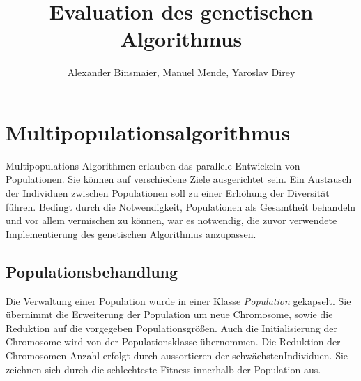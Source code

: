 \documentclass[12pt,a4paper]{article}
\author{Alexander Binsmaier, Manuel Mende, Yaroslav Direy}
\title{Evaluation des genetischen Algorithmus}
\begin{document}
\maketitle
\tableofcontents

\section{Multipopulationsalgorithmus}
Multipopulations-Algorithmen erlauben das parallele Entwickeln von Populationen. Sie können auf verschiedene Ziele ausgerichtet sein. Ein Austausch der Individuen zwischen Populationen soll zu einer Erhöhung der Diversität führen.
Bedingt durch die Notwendigkeit, Populationen als Gesamtheit behandeln und vor allem vermischen zu können, war es notwendig, die zuvor verwendete Implementierung des genetischen Algorithmus anzupassen. 

\subsection{Populationsbehandlung}
Die Verwaltung einer Population wurde in einer Klasse \emph{Population} gekapselt. Sie übernimmt die Erweiterung der Population um neue Chromosome, sowie die Reduktion auf die vorgegeben Populationsgrößen. Auch die Initialisierung der Chromosome wird von der Populationsklasse übernommen. Die Reduktion der Chromosomen-Anzahl erfolgt durch aussortieren der \glqq schwächsten\grqq Individuen. Sie zeichnen sich durch die schlechteste Fitness innerhalb der Population aus.
\end{document}
